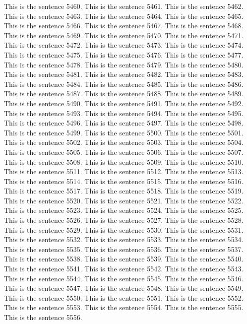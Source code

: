 \documentclass{article}
\begin{document}
This is the sentence 5460.
This is the sentence 5461.
This is the sentence 5462.
This is the sentence 5463.
This is the sentence 5464.
This is the sentence 5465.
This is the sentence 5466.
This is the sentence 5467.
This is the sentence 5468.
This is the sentence 5469.
This is the sentence 5470.
This is the sentence 5471.
This is the sentence 5472.
This is the sentence 5473.
This is the sentence 5474.
This is the sentence 5475.
This is the sentence 5476.
This is the sentence 5477.
This is the sentence 5478.
This is the sentence 5479.
This is the sentence 5480.
This is the sentence 5481.
This is the sentence 5482.
This is the sentence 5483.
This is the sentence 5484.
This is the sentence 5485.
This is the sentence 5486.
This is the sentence 5487.
This is the sentence 5488.
This is the sentence 5489.
This is the sentence 5490.
This is the sentence 5491.
This is the sentence 5492.
This is the sentence 5493.
This is the sentence 5494.
This is the sentence 5495.
This is the sentence 5496.
This is the sentence 5497.
This is the sentence 5498.
This is the sentence 5499.
This is the sentence 5500.
This is the sentence 5501.
This is the sentence 5502.
This is the sentence 5503.
This is the sentence 5504.
This is the sentence 5505.
This is the sentence 5506.
This is the sentence 5507.
This is the sentence 5508.
This is the sentence 5509.
This is the sentence 5510.
This is the sentence 5511.
This is the sentence 5512.
This is the sentence 5513.
This is the sentence 5514.
This is the sentence 5515.
This is the sentence 5516.
This is the sentence 5517.
This is the sentence 5518.
This is the sentence 5519.
This is the sentence 5520.
This is the sentence 5521.
This is the sentence 5522.
This is the sentence 5523.
This is the sentence 5524.
This is the sentence 5525.
This is the sentence 5526.
This is the sentence 5527.
This is the sentence 5528.
This is the sentence 5529.
This is the sentence 5530.
This is the sentence 5531.
This is the sentence 5532.
This is the sentence 5533.
This is the sentence 5534.
This is the sentence 5535.
This is the sentence 5536.
This is the sentence 5537.
This is the sentence 5538.
This is the sentence 5539.
This is the sentence 5540.
This is the sentence 5541.
This is the sentence 5542.
This is the sentence 5543.
This is the sentence 5544.
This is the sentence 5545.
This is the sentence 5546.
This is the sentence 5547.
This is the sentence 5548.
This is the sentence 5549.
This is the sentence 5550.
This is the sentence 5551.
This is the sentence 5552.
This is the sentence 5553.
This is the sentence 5554.
This is the sentence 5555.
This is the sentence 5556.
\end{document}
